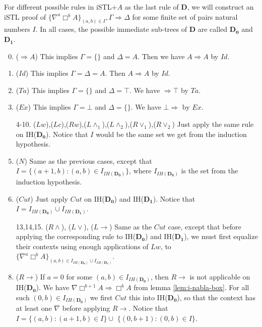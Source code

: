 For different possible rules in iSTL$+A$ as the last rule of $\mathbf{D}$, we will construct an iSTL proof of $\{ \nabla^a \Box^b A\}_{(a,b) \in I} , \Gamma \Rightarrow \Delta$ for some finite set of pairs natural numbers $I$. In all cases, the possible immediate sub-trees of $\mathbf{D}$ are called $\mathbf{D_0}$ and $\mathbf{D_1}$.
\begin{enumerate}
	\setcounter{enumi}{-1}
	\item ($\Rightarrow A$) This implies $\Gamma = \{\}$ and $\Delta = A$. Then we have $A \Rightarrow A$ by $Id$.

	\item ($Id$) This implies $\Gamma = \Delta = A$. Then $A \Rightarrow A$ by $Id$.

	\item ($Ta$) This implies $\Gamma = \{\}$ and $\Delta = \top$. We have $\Rightarrow \top$ by $Ta$.

	\item ($Ex$) This implies $\Gamma = \bot$ and $\Delta = \{\}$. We have $\bot \Rightarrow$ by $Ex$.

	\item[4-10.] ($Lw$),($Lc$),($Rw$),($L\land_1$),($L\land_2$),($R\lor_1$),($R\lor_2$) Just apply the same rule on IH($\mathbf{D_0}$). Notice that $I$ would be the same set we get from the induction hypothesis.
	\setcounter{enumi}{10}

	\item ($N$) Same as the previous cases, except that $I = \{ (a + 1 , b) : (a , b) \in I_{IH(\mathbf{D_0})} \}$, where $I_{IH(\mathbf{D_0})}$ is the set from the induction hypothesis.

	\item ($Cut$) Just apply $Cut$ on IH($\mathbf{D_0}$) and IH($\mathbf{D_1}$). Notice that $I = I_{IH(\mathbf{D_0})} \cup I_{IH(\mathbf{D_1})}$.

	\item[13,14,15.] ($R\land$), ($L\lor$), ($L\rightarrow$) Same as the $Cut$ case, except that before applying the corresponding rule to IH($\mathbf{D_0}$) and IH($\mathbf{D_1}$), we must first equalize their contexts using enough applications of $Lw$, to $\{ \nabla^a \Box^b A \}_{(a,b) \in I_{IH(\mathbf{D_0})} \cup I_{IH(\mathbf{D_1})}}$.
	\setcounter{enumi}{15}

	\item ($R\rightarrow$) If $a = 0$ for some $(a,b) \in I_{IH(\mathbf{D_0})}$, then $R\rightarrow$ is not applicable on IH($\mathbf{D_0}$). We have $\nabla \Box^{b+1} A \Rightarrow \Box^b A$ from lemma \ref{lem:i-nabla-box}. For all such $(0,b) \in I_{IH(\mathbf{D_0})}$ we first $Cut$ this into IH($\mathbf{D_0}$), so that the context has at least one $\nabla$ before applying $R\rightarrow$. Notice that $I = \{ (a, b) : (a+1, b) \in I \} \cup$ $\{ (0, b+1) : (0, b) \in I \}$.
\end{enumerate}

